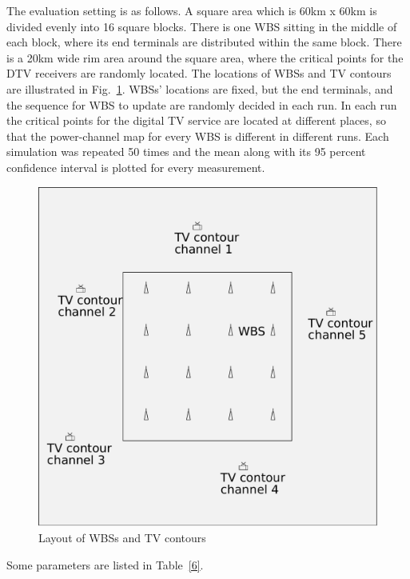 \documentclass[times]{ettauth}
\theoremstyle{mytheoremstyle}
\theoremstyle{mytheoremstyle}
\theoremstyle{mytheoremstyle}
\begin{document}
The evaluation setting is as follows.
A square area which is 60km x 60km is divided evenly into 16 square blocks.
There is one WBS sitting in the middle of each block,  where its end terminals are distributed within the same block.
There is a 20km wide rim area around the square area, where the critical points for the DTV receivers are randomly located.
The locations of WBSs and TV contours are illustrated in Fig.~\ref{sim:layout}.
WBSs' locations are fixed, but the end terminals, and the sequence for WBS to update are randomly decided in each run.
In each run the critical points for the digital TV service are located at different places, so that the power-channel map for every WBS is different in different runs.
Each simulation was repeated 50 times and the mean along with its 95 percent confidence interval is plotted for every measurement. 

\begin{figure}[h!]
  \centering
  \includegraphics[width=0.5\linewidth]{layout.pdf}
  \caption{Layout of WBSs and TV contours}
  \label{sim:layout}
\end{figure}

Some parameters are listed in Table~\ref{6}.
\end{document}
